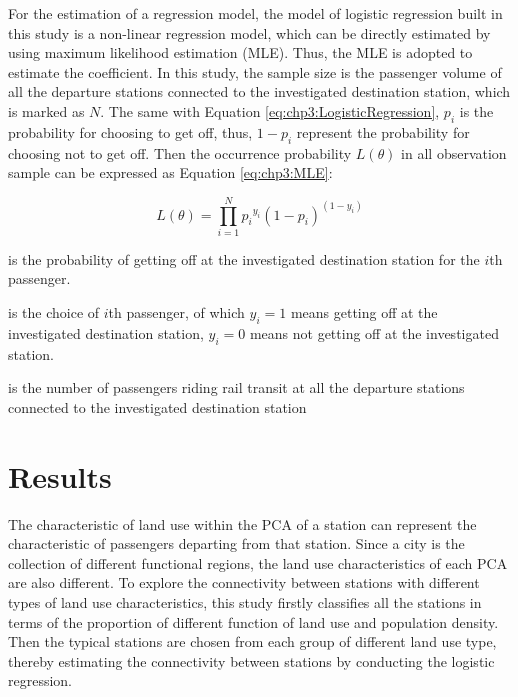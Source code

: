 %
For the estimation of a regression model, the model of logistic regression built in this study is a non-linear regression model, which can be directly estimated by using maximum likelihood estimation (MLE). Thus, the MLE is adopted to estimate the coefficient. In this study, the sample size is the passenger volume of all the departure stations connected to the investigated destination station, which is marked as $N$. The same with Equation \ref{eq:chp3:LogisticRegression}, $p_i$ is the probability for choosing to get off, thus, $1-p_i$ represent the probability for choosing not to get off. Then the occurrence probability $L(\theta)$ in all observation sample can be expressed as Equation \ref{eq:chp3:MLE}:

\begin{equation}
	L(\theta)=\prod_{i=1}^{N}{p_i}^{y_i}(1-p_i)^{(1-y_i)}
	\label{eq:chp3:MLE}
\end{equation}

\begin{description}
	\normalsize
	\item[\textbf{Where:}]
	\item[$p_i$] is the probability of getting off at the investigated destination station for the $i$th passenger.
	\item[$y_i$] is the choice of $i$th passenger, of which $y_i = 1$ means getting off at the investigated destination station, $y_i = 0$ means not getting off at the investigated station.
	\item[$N$] is the number of passengers riding rail transit at all the departure stations connected to the investigated destination station
\end{description}

\section{Results}
%
The characteristic of land use within the PCA of a station can represent the characteristic of passengers departing from that station. Since a city is the collection of different functional regions, the land use characteristics of each PCA are also different. To explore the connectivity between stations with different types of land use characteristics, this study firstly classifies all the stations in terms of the proportion of different function of land use and population density. Then the typical stations are chosen from each group of different land use type, thereby estimating the connectivity between stations by conducting the logistic regression. 

